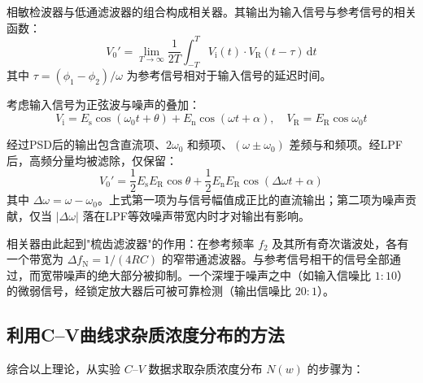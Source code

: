 相敏检波器与低通滤波器的组合构成相关器。其输出为输入信号与参考信号的相关函数：
\begin{equation}
V_{0}' = \lim_{T \to \infty}\frac{1}{2T}\int_{-T}^{T} V_{\mathrm{i}}(t) \cdot V_{\mathrm{R}}(t - \tau)\,\mathrm{d}t
\end{equation}
其中 $\tau = (\phi_{1} - \phi_{2})/\omega$ 为参考信号相对于输入信号的延迟时间。

考虑输入信号为正弦波与噪声的叠加：
\begin{equation}
V_{\mathrm{i}} = E_{\mathrm{s}}\cos(\omega_{0}t + \theta) + E_{\mathrm{n}}\cos(\omega t + \alpha),\quad V_{\mathrm{R}} = E_{\mathrm{R}}\cos\omega_{0}t
\end{equation}

经过PSD后的输出包含直流项、$2\omega_{0}$ 和频项、$(\omega \pm \omega_{0})$ 差频与和频项。经LPF后，高频分量均被滤除，仅保留：
\begin{equation}
V_{0}' = \frac{1}{2}E_{\mathrm{s}}E_{\mathrm{R}}\cos\theta + \frac{1}{2}E_{\mathrm{n}}E_{\mathrm{R}}\cos(\Delta\omega t + \alpha)
\end{equation}
其中 $\Delta\omega = \omega - \omega_{0}$。上式第一项为与信号幅值成正比的直流输出；第二项为噪声贡献，仅当 $|\Delta\omega|$ 落在LPF等效噪声带宽内时才对输出有影响。

相关器由此起到"梳齿滤波器"的作用：在参考频率 $f_{2}$ 及其所有奇次谐波处，各有一个带宽为 $\Delta f_{\mathrm{N}} = 1/(4RC)$ 的窄带通滤波器。与参考信号相干的信号全部通过，而宽带噪声的绝大部分被抑制。一个深埋于噪声之中（如输入信噪比 $1:10$）的微弱信号，经锁定放大器后可被可靠检测（输出信噪比 $20:1$）。


\subsection{利用C--V曲线求杂质浓度分布的方法}

综合以上理论，从实验 $C$--$V$ 数据求取杂质浓度分布 $N(w)$ 的步骤为：

